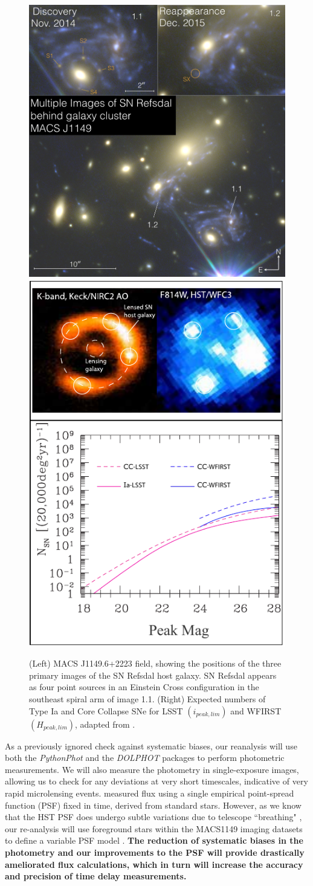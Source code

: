 \begin{figure}[h]
\centering
\includegraphics[width=.5\linewidth]{FIG/refsdal_summary}
\includegraphics[width=.37\linewidth]{FIG/lensed3}
\caption{
(Left) MACS J1149.6+2223 field, showing the positions of the three primary
images of the SN Refsdal host galaxy. SN
Refsdal appears as four point sources in an Einstein Cross
configuration in the southeast spiral arm of image 1.1. (Right)
Expected numbers of Type Ia and Core Collapse SNe for LSST $(i_{peak,lim})$ and 
WFIRST $(H_{peak,lim})$, adapted from \citet{Oguri:2010a}.}
\end{figure}%

As a previously ignored check against systematic biases, our reanalysis will use both the \textit{PythonPhot} and the \textit{DOLPHOT} packages to 
perform photometric measurements. We will also measure the photometry in single-exposure images, allowing us to check for any deviations 
at very short timescales, indicative of very rapid microlensing events. \cite{Rodney:2016} measured flux using a single empirical 
point-spread function (PSF) fixed in time, derived from standard stars. However, as we know that the HST PSF does undergo 
subtle variations due to telescope ``breathing" \citep{Dressel:2012}, our re-analysis will use foreground stars within the MACS1149 imaging 
datasets to define a variable PSF model \citep{Cox:2011}. \textbf{The reduction of systematic biases in the photometry and our improvements to the 
PSF will provide drastically ameliorated flux calculations, which in turn will increase the accuracy and precision of time delay measurements.}

